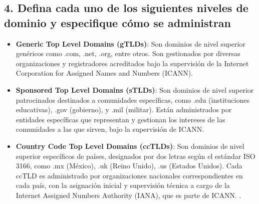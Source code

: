 \documentclass[12pt]{report}
\begin{document}
\subsection*{4. Defina cada uno de los siguientes niveles de dominio y especifique cómo se administran}

\begin{itemize}
	\item \textbf{Generic Top Level Domains (gTLDs)}: Son dominios de nivel superior genéricos como .com, .net, .org, entre otros. Son gestionados por diversas organizaciones y registradores acreditados bajo la supervisión de la Internet Corporation for Assigned Names and Numbers (ICANN). \cite{FAQsICANN}
	
	\item \textbf{Sponsored Top Level Domains (sTLDs)}: Son dominios de nivel superior patrocinados destinados a comunidades específicas, como .edu (instituciones educativas), .gov (gobierno), y .mil (militar). Están administrados por entidades específicas que representan y gestionan los intereses de las comunidades a las que sirven, bajo la supervisión de ICANN.
	
	\item \textbf{Country Code Top Level Domains (ccTLDs)}: Son dominios de nivel superior específicos de países, designados por dos letras según el estándar ISO 3166, como .mx (México), .uk (Reino Unido), .us (Estados Unidos). Cada ccTLD es administrado por organizaciones nacionales correspondientes en cada país, con la asignación inicial y supervisión técnica a cargo de la Internet Assigned Numbers Authority (IANA), que es parte de ICANN. \cite{95EstructuraJerarquica}.
\end{itemize}

\printbibliography
\end{document}
